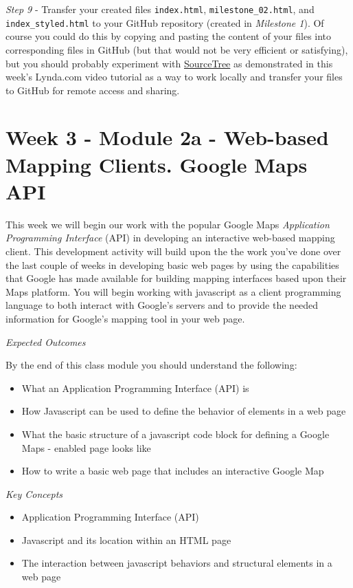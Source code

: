 \documentclass[]{book}
\begin{document}
\emph{Step 9} - Transfer your created files \texttt{index.html},
\texttt{milestone\_02.html}, and \texttt{index\_styled.html} to your
GitHub repository (created in \emph{Milestone 1}). Of course you could
do this by copying and pasting the content of your files into
corresponding files in GitHub (but that would not be very efficient or
satisfying), but you should probably experiment with
\href{https://www.sourcetreeapp.com/}{SourceTree} as demonstrated in
this week's Lynda.com video tutorial as a way to work locally and
transfer your files to GitHub for remote access and sharing.

\chapter{Week 3 - Module 2a - Web-based Mapping Clients. Google Maps
API}\label{week03}

This week we will begin our work with the popular Google Maps
\emph{Application Programming Interface} (API) in developing an
interactive web-based mapping client. This development activity will
build upon the the work you've done over the last couple of weeks in
developing basic web pages by using the capabilities that Google has
made available for building mapping interfaces based upon their Maps
platform. You will begin working with javascript as a client programming
language to both interact with Google's servers and to provide the
needed information for Google's mapping tool in your web page.

\emph{Expected Outcomes}

By the end of this class module you should understand the following:

\begin{itemize}
\item
  What an Application Programming Interface (API) is
\item
  How Javascript can be used to define the behavior of elements in a web
  page
\item
  What the basic structure of a javascript code block for defining a
  Google Maps - enabled page looks like
\item
  How to write a basic web page that includes an interactive Google Map
\end{itemize}

\emph{Key Concepts}

\begin{itemize}
\item
  Application Programming Interface (API)
\item
  Javascript and its location within an HTML page
\item
  The interaction between javascript behaviors and structural elements
  in a web page
\end{itemize}
\end{document}

